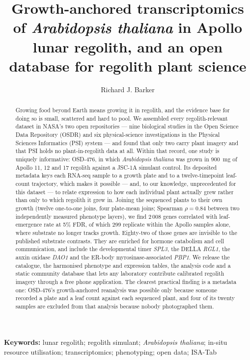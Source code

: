 \documentclass[11pt,a4paper]{article}
\title{\bfseries Growth-anchored transcriptomics of \textit{Arabidopsis thaliana}
in Apollo lunar regolith, and an open database for regolith plant science}
\author[1]{Richard J. Barker}
\affil[1]{Center of Space Exploration (CoSE)}
\date{}
\begin{document}
\maketitle

\begin{abstract}
\noindent
Growing food beyond Earth means growing it in regolith, and the evidence base for
doing so is small, scattered and hard to pool. We assembled every regolith-relevant
dataset in NASA's two open repositories --- nine biological studies in the Open
Science Data Repository (OSDR) and six physical-science investigations in the
Physical Sciences Informatics (PSI) system --- and found that only two carry plant
imagery and that PSI holds no plant-in-regolith data at all. Within that record, one
study is uniquely informative: OSD-476, in which \textit{Arabidopsis thaliana} was
grown in \SI{900}{\milli\gram} of Apollo 11, 12 and 17 regolith against a JSC-1A
simulant control. Its deposited metadata keys each RNA-seq sample to a growth plate
and to a twelve-timepoint leaf-count trajectory, which makes it possible --- and, to
our knowledge, unprecedented for this dataset --- to relate expression to how each
individual plant actually grew rather than only to which regolith it grew in. Joining
the sequenced plants to their own growth (twelve one-to-one joins, four plate-mean
joins; Spearman $\rho=0.84$ between two independently measured phenotype layers), we
find 2\,008 genes correlated with leaf-emergence rate at 5\% FDR, of which 299 replicate
within the Apollo samples alone, where substrate no longer tracks growth. Eighty-two of
those genes are invisible to the published substrate contrasts. They are enriched for
hormone catabolism and cell communication, and include the developmental timer
\textit{SPL3}, the DELLA \textit{RGL1}, the auxin oxidase \textit{DAO1} and the
ER-body myrosinase-associated \textit{PBP1}. We release the catalogue, the harmonised
phenotype and expression tables, the analysis code and a static community database
that lets any laboratory contribute calibrated regolith imagery through a free phone
application. The clearest practical finding is a metadata one: OSD-476's growth-anchored
reanalysis was possible only because someone recorded a plate and a leaf count against
each sequenced plant, and four of its twenty samples are excluded from that analysis
because nobody photographed them.
\end{abstract}

\noindent\textbf{Keywords:} lunar regolith; regolith simulant; \textit{Arabidopsis thaliana};
in-situ resource utilisation; transcriptomics; phenotyping; open data; ISA-Tab
\end{document}
